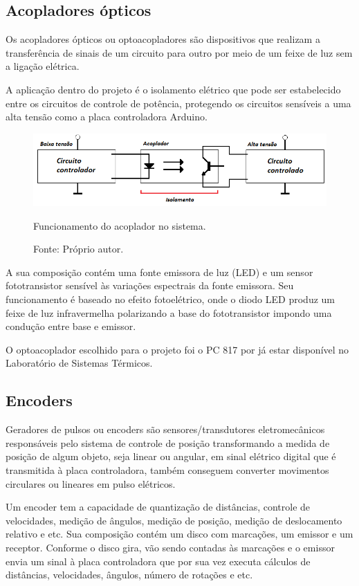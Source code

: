 \subsection{Acopladores ópticos}\label{subsec:metacoplador}

Os acopladores ópticos ou optoacopladores são dispositivos que realizam a transferência de 
sinais de um circuito para outro por meio de um feixe de luz sem a ligação elétrica.

A aplicação dentro do projeto é o isolamento elétrico que pode ser estabelecido entre 
os circuitos de controle de potência, protegendo os circuitos sensíveis a uma alta tensão 
como a placa controladora Arduino.

\begin{figure}[H]
\centering
\includegraphics[width = 1\linewidth]{figuras/acoplador}
\caption{Funcionamento do acoplador no sistema.}
\caption*{Fonte: Próprio autor.}
\label{fig:acoplador}
\end{figure}
    
A sua composição contém uma fonte emissora de luz (LED) e um sensor fototransistor sensível às variações 
espectrais da fonte emissora. Seu funcionamento é baseado no efeito fotoelétrico, onde o diodo LED produz 
um feixe de luz infravermelha polarizando a base do fototransistor impondo uma condução entre base e emissor.

O optoacoplador escolhido para o projeto foi o PC 817 por já estar disponível no Laboratório de Sistemas 
Térmicos.

\subsection{Encoders}\label{subsec:metencoder}

Geradores de pulsos ou encoders são sensores/transdutores eletromecânicos responsáveis pelo sistema de 
controle de posição transformando a medida de posição de algum objeto, seja linear ou angular, em sinal 
elétrico digital que é transmitida à placa controladora, também conseguem converter movimentos circulares 
ou lineares em pulso elétricos.

Um encoder tem a capacidade de quantização de distâncias, controle de velocidades, medição de ângulos, 
medição de posição, medição de deslocamento relativo e etc. Sua composição contém um disco com marcações, 
um emissor e um receptor. Conforme o disco gira, vão sendo contadas às marcações e o emissor envia um sinal 
à placa controladora que por sua vez executa cálculos de distâncias, velocidades, ângulos, número de rotações 
e etc.

